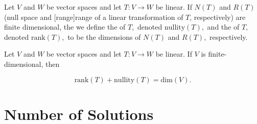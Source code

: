 \documentclass{article}
\begin{document}
\begin{definition}[rank]
	Let $V$ and $W$ be \@{vector spaces} and let $T: V \to W$ be \@{linear}. If $N(T)$ and $R(T)$ (\@{null space} and \@[range]{range of a linear transformation} of $T$, respectively) are \@{finite dimensional}, the we define the  of $T,$ denoted $\text{nullity}(T),$ and the  of $T,$ denoted $\text{rank}(T),$ to be the \@{dimensions} of $N(T)$ and $R(T),$ respectively.
\end{definition}

\begin{theorem}
	Let $V$ and $W$ be \@{vector spaces} and let $T: V \to W$ be \@{linear}. If $V$ is \@{finite-dimensional}, then

	\[ \text{rank}{(T)} + \text{nullity}{(T)} = \text{dim}{(V)}. \]
\end{theorem}

\section{Number of Solutions}
\end{document}
